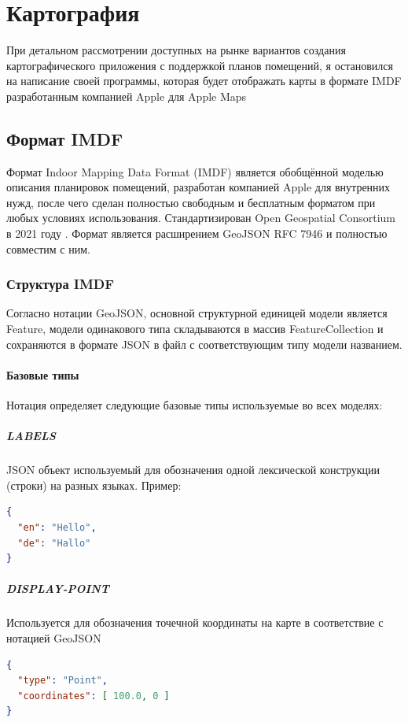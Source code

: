 \chapter{Картография}
  При детальном рассмотрении доступных на рынке вариантов создания картографического приложения с поддержкой планов помещений, я остановился на написание своей программы, которая будет отображать карты в формате IMDF разработанным компанией Apple для Apple Maps
  \section{Формат IMDF}
    Формат Indoor Mapping Data Format (IMDF) \cite{IMDF} является обобщённой моделью описания планировок помещений, разработан компанией Apple для внутренних нужд, после чего сделан полностью свободным и бесплатным форматом при любых условиях использования. Стандартизирован Open Geospatial Consortium в 2021 году \cite{https://www.ogc.org/pressroom/pressreleases/4415}. Формат является расширением GeoJSON RFC 7946 \cite{GeoJSON RFC 7946} и полностью совместим с ним.

    \subsection{Структура IMDF}
      Согласно нотации GeoJSON, основной структурной единицей модели является Feature, модели одинакового типа складываются в массив FeatureCollection и сохраняются в формате JSON в файл с соответствующим типу модели названием.

      \subsubsection{Базовые типы}
        Нотация определяет следующие базовые типы используемые во всех моделях:
        \paragraph{LABELS}
          JSON объект используемый для обозначения одной лексической конструкции (строки) на разных языках. Пример:
          \begin{lstlisting}[language=json,caption={Пример модели LABELS}]
{
  "en": "Hello",
  "de": "Hallo"
}
          \end{lstlisting}

        \paragraph{DISPLAY-POINT}
          Используется для обозначения точечной координаты на карте в соответствие с нотацией GeoJSON
          \begin{lstlisting}[language=json,caption={Пример модели DISPLAY-POINT}]
{
  "type": "Point",
  "coordinates": [ 100.0, 0 ]
}
          \end{lstlisting}

